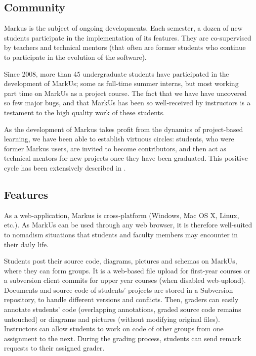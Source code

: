 \documentclass[twocolumn,10pt]{asme2e}
\begin{document}
\subsection*{Community}
Markus is the subject of ongoing developments. Each semester, a dozen of new students participate in the implementation of its features. They are co-supervised by teachers and technical mentors (that often are former students who continue to participate in the evolution of the software).

Since 2008, more than 45 undergraduate students have participated in the development of MarkUs; some as full-time summer interns, but most working part time on MarkUs as a project course. The fact that we have have uncovered so few major bugs, and that MarkUs has been so well-received by instructors is a testament to the high quality work of these students. 

As the development of Markus takes profit from the dynamics of project-based learning, we have been able to establish virtuous circles: students, who were former Markus users, are invited to become contributors, and then act as technical mentors for new projects once they have been graduated. This positive cycle has been extensively described in \cite{magnin-qpes-2011}.

\subsection*{Features}

As a web-application, Markus is cross-platform (Windows, Mac OS X, Linux,
etc.). As MarkUs can be used through any web browser, it is therefore
well-suited to nomadism situations that students and faculty members may
encounter in their daily life.


Students post their source code, diagrams, pictures and schemas on MarkUs,
where they can form groups. It is a web-based file upload for first-year
courses or a subversion client commits for upper year courses (when disabled
web-upload). Documents and source code of students' projects are stored in a
Subversion repository, to handle different versions and conflicts. Then,
graders can easily annotate students' code (overlapping annotations, graded
source code remains untouched) or diagrams and pictures (without modifying
original files). Instructors can allow students to work on code of other
groups from one assignment to the next. During the grading process, students
can send remark requests to their assigned grader.
\end{document}
